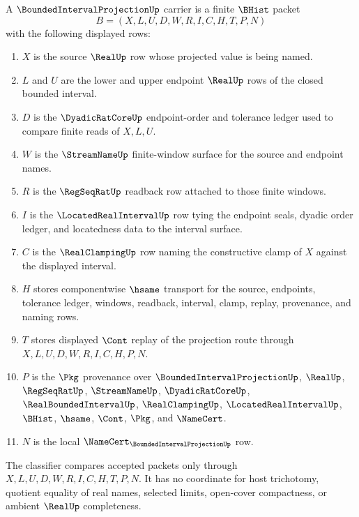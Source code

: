 \begin{definition}
\label{def:bounded-interval-projection-carrier}
A $\BoundedIntervalProjectionUp$ carrier is a finite $\BHist$ packet
$$
B=(X,L,U,D,W,R,I,C,H,T,P,N)
$$
with the following displayed rows:
\begin{enumerate}
\item $X$ is the source $\RealUp$ row whose projected value is being named.
\item $L$ and $U$ are the lower and upper endpoint $\RealUp$ rows of the closed bounded interval.
\item $D$ is the $\DyadicRatCoreUp$ endpoint-order and tolerance ledger used to compare finite reads of $X,L,U$.
\item $W$ is the $\StreamNameUp$ finite-window surface for the source and endpoint names.
\item $R$ is the $\RegSeqRatUp$ readback row attached to those finite windows.
\item $I$ is the $\LocatedRealIntervalUp$ row tying the endpoint seals, dyadic order ledger, and locatedness data to the interval surface.
\item $C$ is the $\RealClampingUp$ row naming the constructive clamp of $X$ against the displayed interval.
\item $H$ stores componentwise $\hsame$ transport for the source, endpoints, tolerance ledger, windows, readback, interval, clamp, replay, provenance, and naming rows.
\item $T$ stores displayed $\Cont$ replay of the projection route through $X,L,U,D,W,R,I,C,H,P,N$.
\item $P$ is the $\Pkg$ provenance over $\BoundedIntervalProjectionUp$, $\RealUp$, $\RegSeqRatUp$, $\StreamNameUp$, $\DyadicRatCoreUp$, $\RealBoundedIntervalUp$, $\RealClampingUp$, $\LocatedRealIntervalUp$, $\BHist$, $\hsame$, $\Cont$, $\Pkg$, and $\NameCert$.
\item $N$ is the local $\NameCert_{\BoundedIntervalProjectionUp}$ row.
\end{enumerate}
The classifier compares accepted packets only through $X,L,U,D,W,R,I,C,H,T,P,N$. It has no coordinate for host trichotomy, quotient equality of real names, selected limits, open-cover compactness, or ambient $\RealUp$ completeness.
\end{definition}

